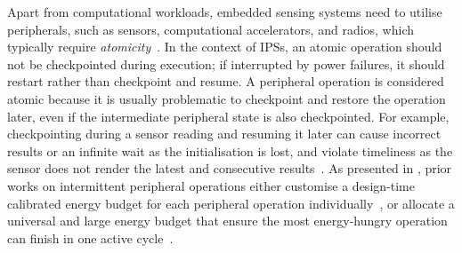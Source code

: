 




Apart from computational workloads, embedded sensing systems need to utilise peripherals, such as sensors, computational accelerators, and radios, which typically require \textit{atomicity}~\cite{berthou2020formal}.
In the context of IPSs, an atomic operation should not be checkpointed during execution; if interrupted by power failures, it should restart rather than checkpoint and resume.
A peripheral operation is considered atomic because it is usually problematic to checkpoint and restore the operation later, even if the intermediate peripheral state is also checkpointed.
For example, checkpointing during a sensor reading and resuming it later can cause incorrect results or an infinite wait as the initialisation is lost, and violate timeliness as the sensor does not render the latest and consecutive results~\cite{maeng2019supporting}. 
As presented in , prior works on intermittent peripheral operations either customise a design-time calibrated energy budget for each peripheral operation individually~\cite{gomez2016dynamic}, or allocate a universal and large energy budget that ensure the most energy-hungry operation can finish in one active cycle~\cite{maeng2019supporting}.


